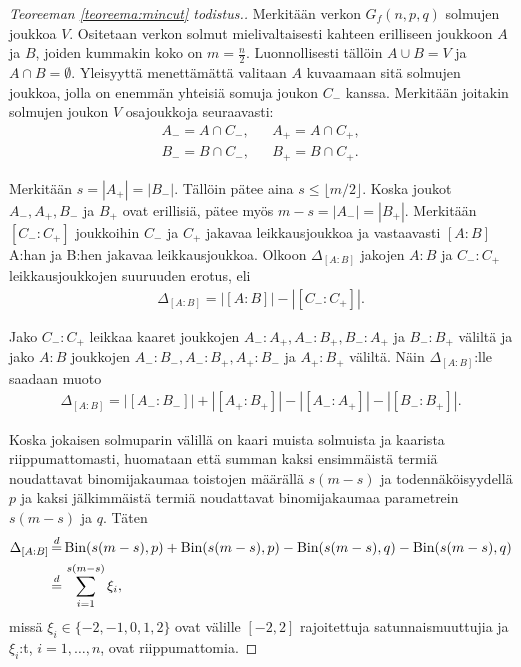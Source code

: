 \documentclass[finnish,12pt,a4paper,pdftex,sci,utf8]{aaltothesis}
\newcommand\floor[1]{\lfloor#1\rfloor}
\begin{document}
\begin{proof}[Teoreeman \ref{teoreema:mincut} todistus.]
	Merkitään verkon $G_f(n,p,q)$ solmujen joukkoa $V$.
        Ositetaan verkon solmut mielivaltaisesti kahteen erilliseen joukkoon $A$ ja $B$, joiden kummakin koko on $m = \frac{n}{2}$.
	Luonnollisesti tällöin $A \cup B = V$ ja $A \cap B = \emptyset$. Yleisyyttä menettämättä valitaan $A$ kuvaamaan sitä solmujen joukkoa, jolla on enemmän yhteisiä somuja joukon $C_-$ kanssa. Merkitään joitakin solmujen joukon $V$ osajoukkoja seuraavasti: 
\begin{eqnarray*}
	A_- = A \cap C_-, & & A_+ = A \cap C_+, \\
	B_- = B \cap C_-, & & B_+ = B \cap C_+.
\end{eqnarray*}

Merkitään $s = |A_+| = |B_-|$. Tällöin pätee aina $s \leq \floor{m/2}$. Koska joukot $A_-, A_+, B_-$ ja $B_+$ ovat erillisiä, pätee myös $m-s = |A_-| = |B_+|$. Merkitään $[C_- : C_+]$ joukkoihin $C_-$ ja $C_+$ jakavaa leikkausjoukkoa ja vastaavasti $[A:B]$ A:han ja B:hen jakavaa leikkausjoukkoa. Olkoon $\Delta_{[A:B]}$ jakojen $A:B$ ja $C_-:C_+$ leikkausjoukkojen suuruuden erotus, eli 
\begin{align*}
	\Delta_{[A:B]} = |[A:B]| - |[C_-:C_+]|.
\end{align*}

Jako $C_-:C_+$ leikkaa kaaret joukkojen $A_-:A_+, A_-:B_+, B_-:A_+$ ja $B_-:B_+$ väliltä ja jako $A:B$ joukkojen $A_-:B_-, A_-:B_+, A_+:B_-$ ja $A_+:B_+$ väliltä. Näin $\Delta_{[A:B]}$:lle saadaan muoto 
\begin{align*}
	\Delta_{[A:B]} = |[A_-:B_-]| + |[A_+:B_+]| - |[A_-:A_+]| - |[B_-:B_+]|.
\end{align*}

Koska jokaisen solmuparin välillä on kaari muista solmuista ja kaarista riippumattomasti, huomataan että summan kaksi ensimmäistä termiä noudattavat binomijakaumaa toistojen määrällä $s(m-s)$ ja todennäköisyydellä $p$ ja kaksi jälkimmäistä termiä noudattavat binomijakaumaa parametrein $s(m-s)$ ja $q$. Täten
\begin{align*}
	\Delta_{[A:B]} &\,{\buildrel d \over =}\, \text{Bin}(s(m-s), p) + \text{Bin}(s(m-s), p) - \text{Bin}(s(m-s), q) - \text{Bin}(s(m-s), q) \\
	&\,{\buildrel d \over =}\, \sum_{i = 1}^{s(m-s)} \xi_i,
\end{align*}
missä $\xi_i \in \{-2, -1, 0, 1, 2\}$ ovat välille $[-2, 2]$ rajoitettuja satunnaismuuttujia ja $\xi_i$:t, $i = 1, \ldots, n$, ovat riippumattomia.


\end{proof}
\end{document}
